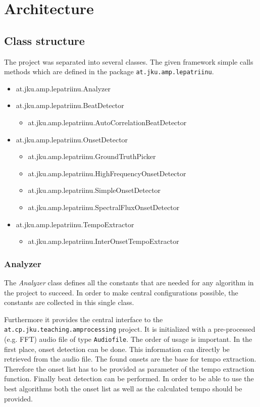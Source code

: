 \chapter{Architecture} \label{cpt:architecture}

\section{Class structure}
The project was separated into several classes. The given framework simple calls
methods which are defined in the package \texttt{at.jku.amp.lepatriinu}.

\begin{itemize}
  \ttfamily
  \item at.jku.amp.lepatriinu.Analyzer
  \item at.jku.amp.lepatriinu.BeatDetector
  \begin{itemize}
    \item at.jku.amp.lepatriinu.AutoCorrelationBeatDetector
  \end{itemize}
  \item at.jku.amp.lepatriinu.OnsetDetector
  \begin{itemize}
    \item at.jku.amp.lepatriinu.GroundTruthPicker 
    \item at.jku.amp.lepatriinu.HighFrequencyOnsetDetector
    \item at.jku.amp.lepatriinu.SimpleOnsetDetector
    \item at.jku.amp.lepatriinu.SpectralFluxOnsetDetector
  \end{itemize}
  \item at.jku.amp.lepatriinu.TempoExtractor
  \begin{itemize}
    \item at.jku.amp.lepatriinu.InterOnsetTempoExtractor
  \end{itemize} 
\end{itemize}

\subsection{\ttfamily Analyzer}
The \emph{Analyzer} class defines all the constants that are needed for any
algorithm in the project to succeed. In order to make central configurations
possible, the constants are collected in this single class.

Furthermore it provides the central interface to the
\texttt{at.cp.jku.teaching.amprocessing} project. It is initialized with a
pre-processed (e.g. FFT) audio file of type \texttt{Audiofile}. The order of
usage is important. In the first place, onset detection can be done. This
information can directly be retrieved from the audio file. The found onsets are
the base for tempo extraction. Therefore the onset list has to be provided as
parameter of the tempo extraction function. Finally beat detection can be
performed. In order to be able to use the best algorithms both the onset list as
well as the calculated tempo should be provided.

